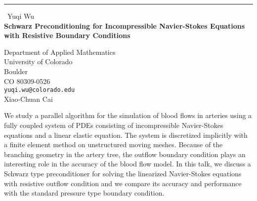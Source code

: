 \documentclass{report}
\begin{document}
\begin{center}
\rule{6in}{1pt} \
{\large Yuqi Wu \\
{\bf Schwarz Preconditioning for Incompressible Navier-Stokes Equations with Resistive Boundary Conditions}}

Department of Applied Mathematics \\ University of Colorado \\ Boulder \\ CO 80309-0526
\\
{\tt yuqi.wu@colorado.edu}\\
Xiao-Chuan  Cai\end{center}

We study a parallel algorithm for the simulation of blood flows in
arteries using a fully coupled system of PDEs consisting of
incompressible Navier-Stokes equations and a linear elastic equation. The
system is discretized implicitly with a finite element method on
unstructured moving meshes. Because of the branching geometry in the
artery tree, the outflow boundary condition plays an interesting role in
the accuracy of the blood flow model. In this talk, we discuss a Schwarz
type preconditioner for solving the linearized Navier-Stokes equations
with resistive outflow condition and we compare its accuracy and
performance with the standard pressure type boundary condition.
\end{document}
